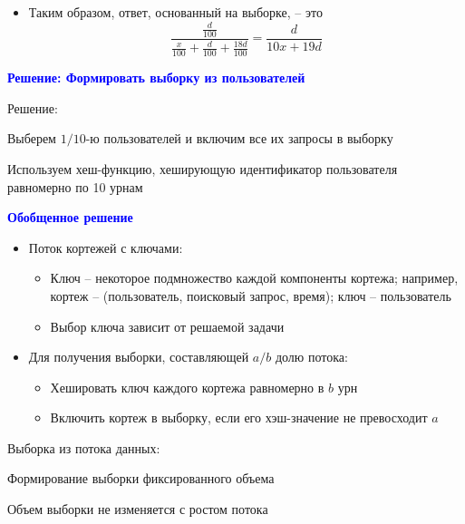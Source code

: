 \documentclass[landscape]{slides}
\begin{document}
\begin{normalsize}
\begin{slide}
\begin{itemize}
\item Таким образом, ответ, основанный на выборке, -- это
$$\frac{\frac{d}{100}}{\frac{x}{100} + \frac{d}{100} + \frac{18d}{100}} = \frac{d}{10x+19d} $$
\end{itemize}
\end{slide}


\begin{slide}
\textbf{\textcolor{blue}{Решение: Формировать выборку из пользователей}}


Решение:

Выберем $1/10$-ю пользователей и включим все их запросы в выборку

Используем хеш-функцию, хеширующую идентификатор пользователя равномерно по 10 урнам
\end{slide}


\begin{slide}
\textbf{\textcolor{blue}{Обобщенное решение}}

\begin{itemize}
\item Поток кортежей с ключами:

  \begin{itemize}
  \item Ключ -- некоторое подмножество каждой компоненты кортежа; например, кортеж -- (пользователь, поисковый запрос, время); ключ -- пользователь

  \item Выбор ключа зависит от решаемой задачи
  \end{itemize}

\item Для получения выборки, составляющей $a/b$ долю потока:

  \begin{itemize}
  \item Хешировать ключ каждого кортежа равномерно в $b$ урн

  \item Включить кортеж в выборку, если его хэш-значение не превосходит $a$
  \end{itemize}
\end{itemize}
\end{slide}


\begin{slide}
Выборка из потока данных:

Формирование выборки фиксированного объема

Объем выборки не изменяется с ростом потока
\end{slide}



\end{normalsize}
\end{document}
